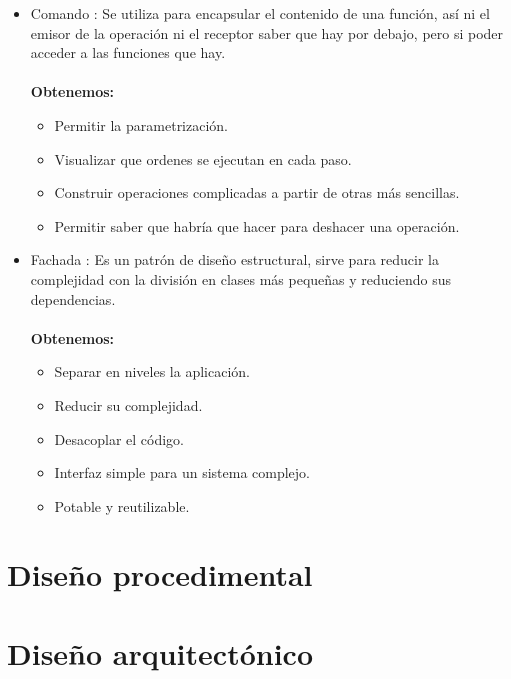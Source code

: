 \begin{itemize}
\item Comando \cite{wiki:Comando}: Se utiliza para encapsular el contenido de una función, así ni el emisor de la operación ni el receptor saber que hay por debajo, pero si poder acceder a las funciones que hay.\\\\
\textbf{Obtenemos:}
\begin{itemize}
\item Permitir la parametrización.
\item Visualizar que ordenes se ejecutan en cada paso.
\item Construir operaciones complicadas a partir de otras más sencillas.
\item Permitir saber que habría que hacer para deshacer una operación.
\end{itemize}
\item Fachada \cite{wiki:Fachada}: Es un patrón de diseño estructural, sirve para reducir la complejidad con la división en clases más pequeñas y reduciendo sus dependencias.\\\\
\textbf{Obtenemos:}
\begin{itemize}
\item Separar en niveles la aplicación.
\item Reducir su complejidad.
\item Desacoplar el código.
\item Interfaz simple para un sistema complejo.
\item Potable y reutilizable.
\end{itemize}
\end{itemize}

\section{Diseño procedimental}

\section{Diseño arquitectónico}
